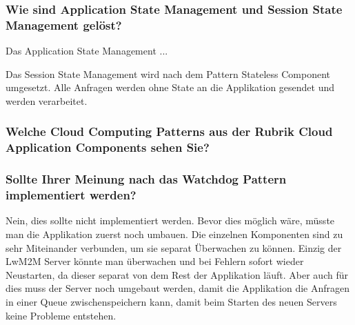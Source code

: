 \subsubsection{Wie sind Application State Management und Session State Management gelöst?}
Das Application State Management ...

Das Session State Management wird nach dem Pattern Stateless Component umgesetzt. Alle Anfragen werden ohne State an die Applikation gesendet und werden verarbeitet. 

\subsubsection{Welche Cloud Computing Patterns aus der Rubrik Cloud Application Components sehen Sie?}


\subsubsection{Sollte Ihrer Meinung nach das Watchdog Pattern implementiert werden?}
Nein, dies sollte nicht implementiert werden. Bevor dies möglich wäre, müsste man die Applikation zuerst noch umbauen. Die einzelnen Komponenten sind zu sehr Miteinander verbunden, um sie separat Überwachen zu können. Einzig der LwM2M Server könnte man überwachen und bei Fehlern sofort wieder Neustarten, da dieser separat von dem Rest der Applikation läuft. Aber auch für dies muss der Server noch umgebaut werden, damit die Applikation die Anfragen in einer Queue zwischenspeichern kann, damit beim Starten des neuen Servers keine Probleme entstehen.
